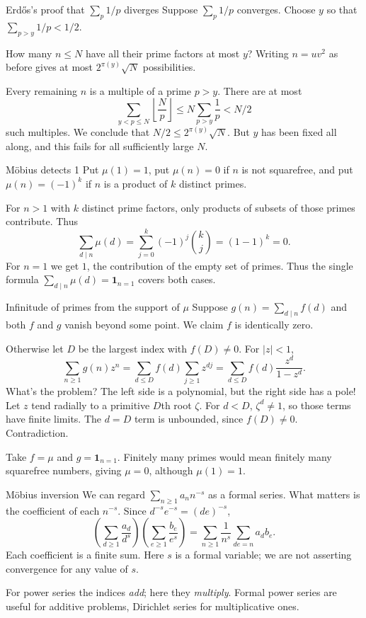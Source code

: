 \documentclass[aspectratio=169,11pt]{beamer}
\newcommand{\ind}{\mathbf1}
\begin{document}
\begin{frame}{Erd\H{o}s's proof that $\sum_p1/p$ diverges}
Suppose $\sum_p1/p$ converges. Choose $y$ so that $\sum_{p>y}1/p<1/2$.

How many $n\le N$ have all their prime factors at most $y$? Writing $n=uv^2$ as before gives at most $2^{\pi(y)}\sqrt N$ possibilities.

Every remaining $n$ is a multiple of a prime $p>y$. There are at most
\[\sum_{y<p\le N}\left\lfloor\frac Np\right\rfloor\le N\sum_{p>y}\frac1p<N/2\]
such multiples. We conclude that $N/2\le2^{\pi(y)}\sqrt N$. But $y$ has been fixed all along, and this fails for all sufficiently large $N$.
\end{frame}
\begin{frame}{M\"obius detects 1}
Put $\mu(1)=1$, put $\mu(n)=0$ if $n$ is not squarefree, and put $\mu(n)=(-1)^k$ if $n$ is a product of $k$ distinct primes.

For $n>1$ with $k$ distinct prime factors, only products of subsets of those primes contribute. Thus
\[\sum_{d\mid n}\mu(d)=\sum_{j=0}^k(-1)^j\binom kj=(1-1)^k=0.\]
For $n=1$ we get $1$, the contribution of the empty set of primes. Thus the single formula $\sum_{d\mid n}\mu(d)=\ind_{n=1}$ covers both cases.
\end{frame}
\begin{frame}{Infinitude of primes from the support of $\mu$}
Suppose $g(n)=\sum_{d\mid n}f(d)$ and both $f$ and $g$ vanish beyond some point. We claim $f$ is identically zero.

Otherwise let $D$ be the largest index with $f(D)\ne0$. For $|z|<1$,
\[\sum_{n\ge1}g(n)z^n=\sum_{d\le D}f(d)\sum_{j\ge1}z^{dj}=\sum_{d\le D}f(d)\frac{z^d}{1-z^d}.\]
What's the problem? The left side is a polynomial, but the right side has a pole! Let $z$ tend radially to a primitive $D$th root $\zeta$. For $d<D$, $\zeta^d\ne1$, so those terms have finite limits. The $d=D$ term is unbounded, since $f(D)\ne0$. Contradiction.

Take $f=\mu$ and $g=\ind_{n=1}$. Finitely many primes would mean finitely many squarefree numbers, giving $\mu=0$, although $\mu(1)=1$.
\end{frame}
\begin{frame}{M\"obius inversion}
We can regard $\sum_{n\ge1}a_nn^{-s}$ as a formal series. What matters is the coefficient of each $n^{-s}$. Since $d^{-s}e^{-s}=(de)^{-s}$,
\[\left(\sum_{d\ge1}\frac{a_d}{d^s}\right)\left(\sum_{e\ge1}\frac{b_e}{e^s}\right)=\sum_{n\ge1}\frac1{n^s}\sum_{de=n}a_db_e.\]
Each coefficient is a finite sum. Here $s$ is a formal variable; we are not asserting convergence for any value of $s$.

For power series the indices \emph{add}; here they \emph{multiply}. Formal power series are useful for additive problems, Dirichlet series for multiplicative ones.
\end{frame}
\end{document}
